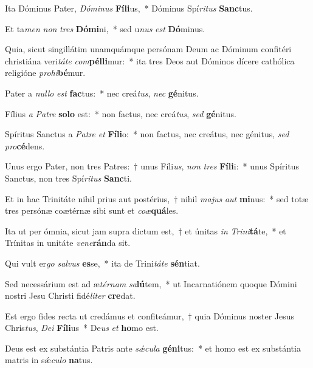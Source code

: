 \item Ita Dóminus Pater, \textit{Dó}\textit{mi}\textit{nus} \textbf{Fí}\textbf{li}us,~* Dóminus Spí\textit{ri}\textit{tus} \textbf{Sanc}tus.
\item Et ta\textit{men} \textit{non} \textit{tres} \textbf{Dó}\textbf{mi}ni,~* sed u\textit{nus} \textit{est} \textbf{Dó}minus.
\item Quia, sicut singillátim unamquámque persónam Deum ac Dóminum confitéri christiána veri\textit{tá}\textit{te} \textit{com}\textbf{pél}\textbf{li}mur:~* ita tres Deos aut Dóminos dícere cathólica religióne \textit{pro}\textit{hi}\textbf{bé}mur.
\item Pater a \textit{nul}\textit{lo} \textit{est} \textbf{fac}tus:~* nec creá\textit{tus}, \textit{nec} \textbf{gé}nitus.
\item Fílius \textit{a} \textit{Pa}\textit{tre} \textbf{so}\textbf{lo} est:~* non factus, nec creá\textit{tus}, \textit{sed} \textbf{gé}nitus.
\item Spíritus Sanctus a \textit{Pa}\textit{tre} \textit{et} \textbf{Fí}\textbf{li}o:~* non factus, nec creátus, nec génitus, \textit{sed} \textit{pro}\textbf{cé}dens.
\item Unus ergo Pater, non tres Patres:~† unus Fíli\textit{us}, \textit{non} \textit{tres} \textbf{Fí}\textbf{li}i:~* unus Spíritus Sanctus, non tres Spí\textit{ri}\textit{tus} \textbf{Sanc}ti.
\item Et in hac Trinitáte nihil prius aut postérius,~† nihil \textit{ma}\textit{jus} \textit{aut} \textbf{mi}nus:~* sed totæ tres persónæ coætérnæ sibi sunt et \textit{co}\textit{æ}\textbf{quá}les.
\item Ita ut per ómnia, sicut jam supra dictum est,~† et únitas \textit{in} \textit{Tri}\textit{ni}\textbf{tá}te,~* et Trínitas in unitáte \textit{ve}\textit{ne}\textbf{rán}da sit.
\item Qui vult er\textit{go} \textit{sal}\textit{vus} \textbf{es}se,~* ita de Trini\textit{tá}\textit{te} \textbf{sén}tiat.
\item Sed necessárium est ad æ\textit{tér}\textit{nam} \textit{sa}\textbf{lú}tem,~* ut Incarnatiónem quoque Dómini nostri Jesu Christi fidé\textit{li}\textit{ter} \textbf{cre}dat.
\item Est ergo fides recta ut credámus et confiteámur,~† quia Dóminus noster Jesus Chris\textit{tus}, \textit{De}\textit{i} \textbf{Fí}\textbf{li}us~* De\textit{us} \textit{et} \textbf{ho}mo est.
\item Deus est ex substántia Patris ante \textit{sǽ}\textit{cu}\textit{la} \textbf{gé}\textbf{ni}tus:~* et homo est ex substántia matris in sǽ\textit{cu}\textit{lo} \textbf{na}tus.
